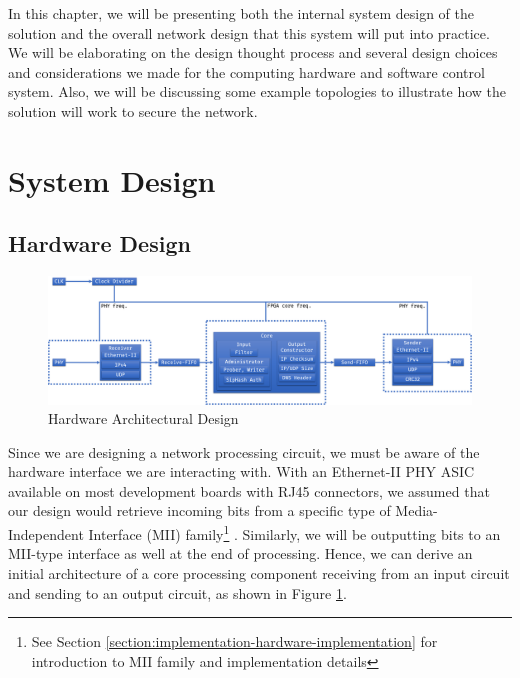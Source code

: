 \documentclass[a4paper]{report}
\begin{document}
In this chapter, we will be presenting both the internal system design of the solution and the overall network design that this system will put into practice. We will be elaborating on the design thought process and several design choices and considerations we made for the computing hardware and software control system. Also, we will be discussing some example topologies to illustrate how the solution will work to secure the network.

\section{System Design}

\subsection{Hardware Design}
\label{section:design-system-design-hardware}

\begin{figure}[h!]
  \includegraphics[width=\textwidth]{imgs/hardware-design.png}
  \caption{Hardware Architectural Design}
  \label{fig:hardware-design}
\end{figure}

Since we are designing a network processing circuit, we must be aware of the hardware interface we are interacting with. With an Ethernet-II PHY ASIC available on most development boards with RJ45 connectors, we assumed that our design would retrieve incoming bits from a specific type of Media-Independent Interface (MII) family\footnote{See Section \ref{section:implementation-hardware-implementation} for introduction to MII family and implementation details} \cite{ieee802.3ethernet-2018}. Similarly, we will be outputting bits to an MII-type interface as well at the end of processing. Hence, we can derive an initial architecture of a core processing component receiving from an input circuit and sending to an output circuit, as shown in Figure \ref{fig:hardware-design}.
\end{document}
